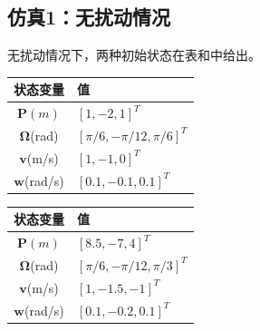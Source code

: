\subsection{仿真1：无扰动情况}\label{sec:sim3-1}
无扰动情况下，两种初始状态在表和中给出。
\begin{table}[htp]
    \centering
    \vspace{0.5em}
    \begin{tabular}{cl}
        \toprule
        状态变量&值  \\
        \midrule
        $\mathbf{P}(m)$&$[1,-2,1]^T$  \\
        $\mathbf{\Omega}$(rad)&$[\pi/6,-\pi/12,\pi/6]^T$  \\
        $\mathbf{v}$(m/s)&$[1,-1,0]^T$  \\
        $\mathbf{w}$(rad/s)&$[0.1,-0.1,0.1]^T$\\
        \bottomrule
    \end{tabular}    
\end{table}
\begin{table}[htp]
    \centering
    \vspace{0.5em}
    \begin{tabular}{cl}
        \toprule
        状态变量&值  \\
        \midrule
        $\mathbf{P}(m)$&$[8.5,-7,4]^T$  \\
        $\mathbf{\Omega}$(rad)&$[\pi/6,-\pi/12,\pi/3]^T$  \\
        $\mathbf{v}$(m/s)&$[1,-1.5,-1]^T$  \\
        $\mathbf{w}$(rad/s)&$[0.1,-0.2,0.1]^T$\\
        \bottomrule
    \end{tabular}    
\end{table}

